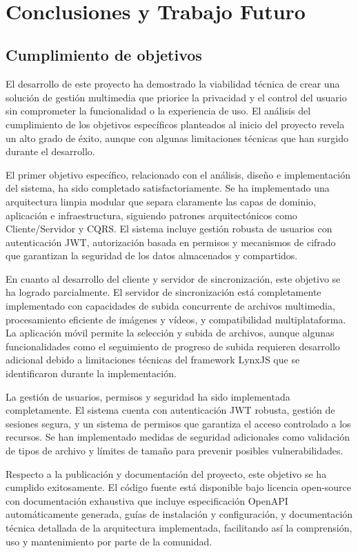 \newpage
~
\newpage
\chapter{Conclusiones y Trabajo Futuro}

\section{Cumplimiento de objetivos}

El desarrollo de este proyecto ha demostrado la viabilidad técnica de crear una solución de gestión multimedia que priorice la privacidad y el control del usuario sin comprometer la funcionalidad o la experiencia de uso. El análisis del cumplimiento de los objetivos específicos planteados al inicio del proyecto revela un alto grado de éxito, aunque con algunas limitaciones técnicas que han surgido durante el desarrollo.

El primer objetivo específico, relacionado con el análisis, diseño e implementación del sistema, ha sido completado satisfactoriamente. Se ha implementado una arquitectura limpia modular que separa claramente las capas de dominio, aplicación e infraestructura, siguiendo patrones arquitectónicos como Cliente/Servidor y CQRS. El sistema incluye gestión robusta de usuarios con autenticación JWT, autorización basada en permisos y mecanismos de cifrado que garantizan la seguridad de los datos almacenados y compartidos.

En cuanto al desarrollo del cliente y servidor de sincronización, este objetivo se ha logrado parcialmente. El servidor de sincronización está completamente implementado con capacidades de subida concurrente de archivos multimedia, procesamiento eficiente de imágenes y vídeos, y compatibilidad multiplataforma. La aplicación móvil permite la selección y subida de archivos, aunque algunas funcionalidades como el seguimiento de progreso de subida requieren desarrollo adicional debido a limitaciones técnicas del framework LynxJS que se identificaron durante la implementación.

La gestión de usuarios, permisos y seguridad ha sido implementada completamente. El sistema cuenta con autenticación JWT robusta, gestión de sesiones segura, y un sistema de permisos que garantiza el acceso controlado a los recursos. Se han implementado medidas de seguridad adicionales como validación de tipos de archivo y límites de tamaño para prevenir posibles vulnerabilidades.

Respecto a la publicación y documentación del proyecto, este objetivo se ha cumplido exitosamente. El código fuente está disponible bajo licencia open-source con documentación exhaustiva que incluye especificación OpenAPI automáticamente generada, guías de instalación y configuración, y documentación técnica detallada de la arquitectura implementada, facilitando así la comprensión, uso y mantenimiento por parte de la comunidad.


